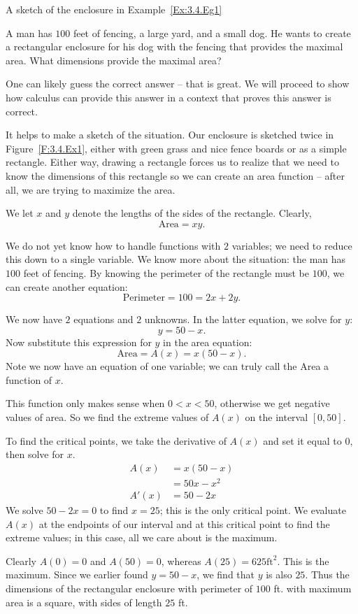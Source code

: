 \begin{marginfigure}[5cm]
\caption{A sketch of the enclosure in Example~\ref{Ex:3.4.Eg1} } \label{F:3.4.Ex1}
\end{marginfigure}

\begin{example} \label{Ex:3.4.Eg1}
A man has $100$ feet of fencing, a large yard, and a small dog. He wants to create a rectangular enclosure for his dog with the fencing that provides the maximal area. What dimensions provide the maximal area?

\solution One can likely guess the correct answer -- that is great. We will proceed to show how calculus can provide this answer in a context that proves this answer is correct.

It helps to make a sketch of the situation. Our enclosure is sketched twice in Figure~\ref{F:3.4.Ex1}, either with green grass and nice fence boards or as a simple rectangle. Either way, drawing a rectangle forces us to realize that we need to know the dimensions of this rectangle so we can create an area function -- after all, we are trying to maximize the area.

We let $x$ and $y$ denote the lengths of the sides of the rectangle. Clearly, $$\text{Area}=xy.$$

We do not yet know how to handle functions with $2$ variables; we need to reduce this down to a single variable. We know more about the situation: the man has $100$ feet of fencing. By knowing the perimeter of the rectangle must be $100$, we can create another equation: $$\text{Perimeter} = 100 = 2x+2y.$$

We now have $2$ equations and $2$ unknowns. In the latter equation, we solve for $y$:
$$y = 50-x.$$ Now substitute this expression for $y$ in the area equation:
$$ \text{Area} = A(x) = x(50-x).$$ Note we now have an equation of one variable; we can truly call the Area a function of $x$. 

This function only makes sense when $0 < x < 50$, otherwise we get negative values of area. So we find the extreme values of $A(x)$ on the interval $[0,50]$. 

To find the critical points, we take the derivative of $A(x)$ and set it equal to $0$, then solve for $x$.
\begin{align*}
A(x) &= x(50-x) \\
&= 50x-x^2 \\
A'(x) 	&= 50-2x
\end{align*}
We solve $50-2x=0$ to find $x=25$; this is the only critical point. We evaluate $A(x)$ at the endpoints of our interval and at this critical point to find the extreme values; in this case, all we care about is the maximum.

Clearly $A(0)=0$ and $A(50)=0$, whereas $A(25) = 625 \text{ft}^2$. This is the maximum. Since we earlier found $y = 50-x$, we find that $y$ is also $25$. Thus the dimensions of the rectangular enclosure with perimeter of $100$ ft. with maximum area is a square, with sides of length $25$ ft.


\end{example}